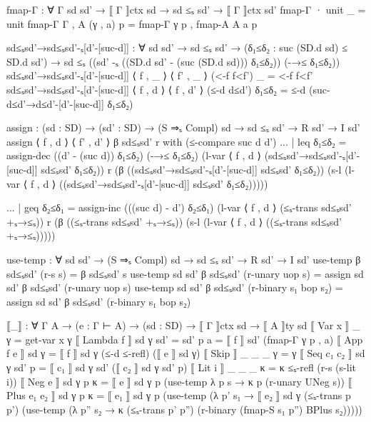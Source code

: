 \documentclass{article}
\begin{document}
\begin{prev}
\begin{code}
fmap-Γ : ∀ {Γ sd sd'} → ⟦ Γ ⟧ctx sd → sd ≤ₛ sd' → ⟦ Γ ⟧ctx sd'
fmap-Γ {·} unit _ = unit
fmap-Γ {Γ , A} (γ , a) p = fmap-Γ γ p , fmap-A {A} a p


sd≤ₛsd'→sd≤ₛsd'-ₛ[d'-[suc-d]] : ∀ {sd sd'} → sd ≤ₛ sd' → (δ₁≤δ₂ : suc (SD.d sd) ≤ SD.d sd') → sd ≤ₛ ((sd' -ₛ ((SD.d sd' - (suc (SD.d sd))) δ₁≤δ₂)) (-→≤ δ₁≤δ₂))
sd≤ₛsd'→sd≤ₛsd'-ₛ[d'-[suc-d]] {⟨ f , _ ⟩} {⟨ f' , _ ⟩} (<-f f<f') _ = <-f f<f'
sd≤ₛsd'→sd≤ₛsd'-ₛ[d'-[suc-d]] {⟨ f , d ⟩} {⟨ f , d' ⟩} (≤-d d≤d') δ₁≤δ₂ = ≤-d (suc-d≤d'→d≤d'-[d'-[suc-d]] δ₁≤δ₂)

assign : (sd : SD) → (sd' : SD) → (S ⇒ₛ Compl) sd → sd ≤ₛ sd' → R sd' → I sd'
assign ⟨ f , d ⟩ ⟨ f' , d' ⟩ β sd≤ₛsd' r with (≤-compare {suc d} {d'})
... | leq δ₁≤δ₂ = assign-dec ((d' - (suc d)) δ₁≤δ₂) 
                    (-→≤ δ₁≤δ₂) (l-var ⟨ f , d ⟩ (sd≤ₛsd'→sd≤ₛsd'-ₛ[d'-[suc-d]] sd≤ₛsd' δ₁≤δ₂)) r 
                    (β ((sd≤ₛsd'→sd≤ₛsd'-ₛ[d'-[suc-d]] sd≤ₛsd' δ₁≤δ₂)) 
                        (s-l (l-var ⟨ f , d ⟩ ((sd≤ₛsd'→sd≤ₛsd'-ₛ[d'-[suc-d]] sd≤ₛsd' δ₁≤δ₂)))))


... | geq δ₂≤δ₁ = assign-inc (((suc d) - d') δ₂≤δ₁) 
                    (l-var ⟨ f , d ⟩ (≤ₛ-trans sd≤ₛsd' +ₛ→≤ₛ)) r 
                    (β ((≤ₛ-trans sd≤ₛsd' +ₛ→≤ₛ)) 
                        (s-l (l-var ⟨ f , d ⟩ ((≤ₛ-trans sd≤ₛsd' +ₛ→≤ₛ)))))

use-temp : ∀ {sd sd'} → (S ⇒ₛ Compl) sd → sd ≤ₛ sd' → R sd' → I sd'
use-temp β sd≤ₛsd' (r-s s) = β sd≤ₛsd' s
use-temp {sd} {sd'} β sd≤ₛsd' (r-unary uop s) = 
    assign sd sd' β sd≤ₛsd' (r-unary uop s)
use-temp {sd} {sd'} β sd≤ₛsd' (r-binary s₁ bop s₂) = 
    assign sd sd' β sd≤ₛsd' (r-binary s₁ bop s₂)


⟦_⟧ : ∀ {Γ A} → (e : Γ ⊢ A) → (sd : SD) → ⟦ Γ ⟧ctx sd → ⟦ A ⟧ty sd
⟦ Var x ⟧ _ γ = get-var x γ
⟦ Lambda f ⟧ sd γ {sd' = sd'} p a = ⟦ f ⟧ sd' (fmap-Γ γ p , a) 
⟦ App f e ⟧ sd γ = ⟦ f ⟧ sd γ (≤-d ≤-refl) (⟦ e ⟧ sd γ)
⟦ Skip ⟧ _ _ _ γ = γ
⟦ Seq c₁ c₂ ⟧ sd γ sd' p = ⟦ c₁ ⟧ sd γ sd' (⟦ c₂ ⟧ sd γ sd' p)
⟦ Lit i ⟧ _ _ _ κ = κ ≤ₛ-refl (r-s (s-lit i))
⟦ Neg e ⟧ sd γ p κ = ⟦ e ⟧ sd γ p (use-temp λ p s → κ p (r-unary UNeg s))    
⟦ Plus e₁ e₂ ⟧ sd γ p κ = ⟦ e₁ ⟧ sd γ p (use-temp (λ p' s₁ → ⟦ e₂ ⟧ sd γ (≤ₛ-trans p p') (use-temp (λ p'' s₂ →  κ (≤ₛ-trans p' p'') (r-binary (fmap-S s₁ p'') BPlus s₂)))))
\end{code}
\end{prev}
\end{document}
